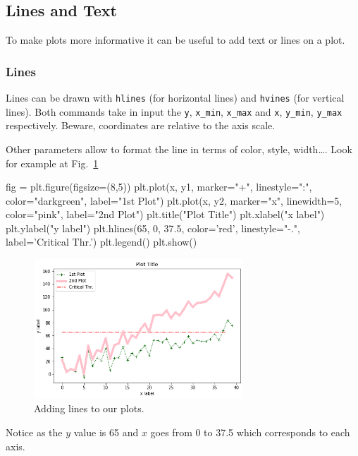 \begin{ipython}
\subsection{Lines and Text}\label{lines-and-text}

To make plots more informative it can be useful to add text or lines on
a plot.

\subsubsection{Lines}\label{lines}

Lines can be drawn with \texttt{hlines} (for horizontal lines) and
\texttt{hvines} (for vertical lines). Both commands take in input the
\texttt{y}, \texttt{x\_min}, \texttt{x\_max} and \texttt{x}, \texttt{y\_min}, \texttt{y\_max}
respectively. Beware, coordinates are relative to the axis scale.

Other parameters allow to format the line in terms of color, style,
width\ldots. Look for example at Fig.~\ref{fig:lines}

\begin{ipython}
fig = plt.figure(figsize=(8,5))
plt.plot(x, y1, marker="+", linestyle=":", color="darkgreen", label="1st Plot")
plt.plot(x, y2, marker="x", linewidth=5, color="pink", label="2nd Plot")
plt.title("Plot Title")
plt.xlabel("x label")
plt.ylabel("y label")
plt.hlines(65, 0, 37.5, color='red', linestyle="-.", label='Critical Thr.')
plt.legend()
plt.show()
\end{ipython}

\begin{figure}[htb]
	\centering
	\includegraphics[width=0.7\textwidth]{figures/lines}
	\caption{Adding lines to our plots.}
	\label{fig:lines}
\end{figure}

Notice as the \(y\) value is 65 and \(x\) goes from 0 to 37.5 which
corresponds to each axis.


\end{ipython}

